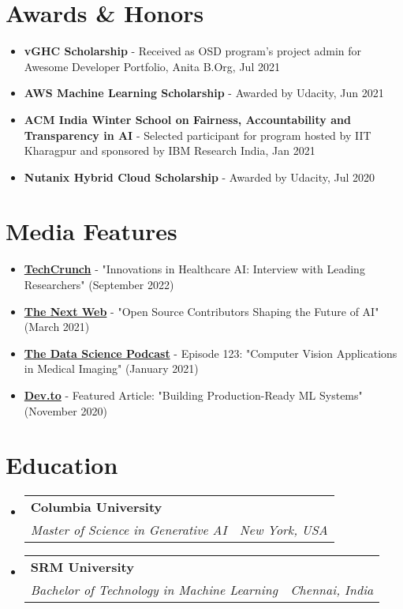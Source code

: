 \documentclass[letterpaper,11pt]{article}
\makeatletter
\newcommand{\resumeItem}[1]{
  \item\small{
    {#1 \vspace{-2pt}}
  }
}
\newcommand{\resumeEducation}[3]{
  \vspace{-2pt}\item
    \begin{tabular*}{1.0\textwidth}[t]{l@{\extracolsep{\fill}}r}
      \textbf{#1} & \\
      \textit{\small#2} & \textit{\small #3} \\
    \end{tabular*}\vspace{-7pt}
}
\newcommand{\resumeSubHeadingListStart}{\begin{itemize}[leftmargin=0.0in, label={}]}
\newcommand{\resumeSubHeadingListEnd}{\end{itemize}}
\newcommand{\resumeItemListStart}{\begin{itemize}}
\newcommand{\resumeItemListEnd}{\end{itemize}\vspace{-5pt}}
\makeatother
\begin{document}
\section{Awards \& Honors}
\resumeSubHeadingListStart
  \resumeItemListStart
    \resumeItem{\textbf{vGHC Scholarship} - Received as OSD program's project admin for Awesome Developer Portfolio, Anita B.Org, Jul 2021}
    \resumeItem{\textbf{AWS Machine Learning Scholarship} - Awarded by Udacity, Jun 2021}
    \resumeItem{\textbf{ACM India Winter School on Fairness, Accountability and Transparency in AI} - Selected participant for program hosted by IIT Kharagpur and sponsored by IBM Research India, Jan 2021}
    \resumeItem{\textbf{Nutanix Hybrid Cloud Scholarship} - Awarded by Udacity, Jul 2020}
  \resumeItemListEnd
\resumeSubHeadingListEnd

\section{Media Features}
\resumeSubHeadingListStart
  \resumeItemListStart
    \resumeItem{\textbf{\href{https://techcrunch.com/article/12345}{\textcolor{maincolor}{TechCrunch}}} - "Innovations in Healthcare AI: Interview with Leading Researchers" (September 2022)}
    \resumeItem{\textbf{\href{https://thenextweb.com/article/56789}{\textcolor{maincolor}{The Next Web}}} - "Open Source Contributors Shaping the Future of AI" (March 2021)}
    \resumeItem{\textbf{\href{https://thedatasciencepodcast.com/episode/123}{\textcolor{maincolor}{The Data Science Podcast}}} - Episode 123: "Computer Vision Applications in Medical Imaging" (January 2021)}
    \resumeItem{\textbf{\href{https://devto.com/article/45678}{\textcolor{maincolor}{Dev.to}}} - Featured Article: "Building Production-Ready ML Systems" (November 2020)}
  \resumeItemListEnd
\resumeSubHeadingListEnd

\section{Education}
\resumeSubHeadingListStart
 \resumeEducation
   {Columbia University}
   {Master of Science in Generative AI}{New York, USA}
 \resumeEducation
   {SRM University}
   {Bachelor of Technology in Machine Learning}{Chennai, India}
\resumeSubHeadingListEnd
\end{document}
